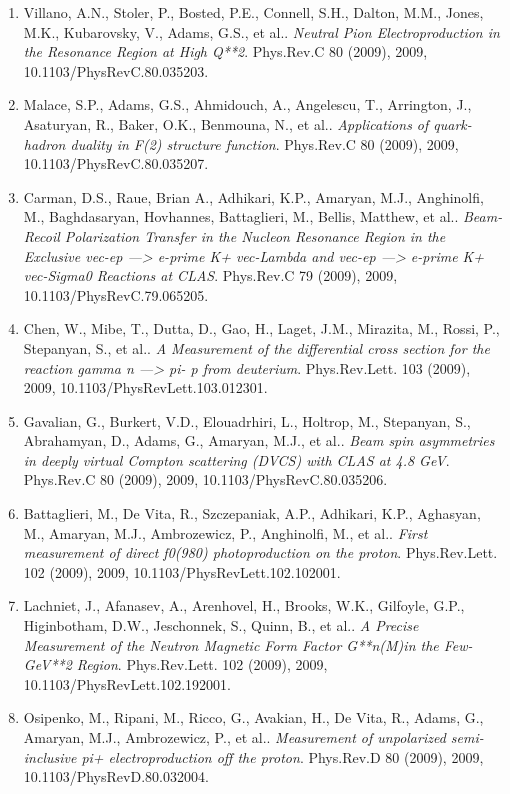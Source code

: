 \begin{enumerate}
\item Villano, A.N., Stoler, P., Bosted, P.E., Connell, S.H., Dalton, M.M., Jones, M.K., Kubarovsky, V., Adams, G.S., et al.. \textit{Neutral Pion Electroproduction in the Resonance Region at High Q**2}. Phys.Rev.C 80 (2009), 2009, 10.1103/PhysRevC.80.035203.
\item Malace, S.P., Adams, G.S., Ahmidouch, A., Angelescu, T., Arrington, J., Asaturyan, R., Baker, O.K., Benmouna, N., et al.. \textit{Applications of quark-hadron duality in F(2) structure function}. Phys.Rev.C 80 (2009), 2009, 10.1103/PhysRevC.80.035207.
\item Carman, D.S., Raue, Brian A., Adhikari, K.P., Amaryan, M.J., Anghinolfi, M., Baghdasaryan, Hovhannes, Battaglieri, M., Bellis, Matthew, et al.. \textit{Beam-Recoil Polarization Transfer in the Nucleon Resonance Region in the Exclusive vec-ep ---> e-prime K+ vec-Lambda and vec-ep ---> e-prime K+ vec-Sigma0 Reactions at CLAS}. Phys.Rev.C 79 (2009), 2009, 10.1103/PhysRevC.79.065205.
\item Chen, W., Mibe, T., Dutta, D., Gao, H., Laget, J.M., Mirazita, M., Rossi, P., Stepanyan, S., et al.. \textit{A Measurement of the differential cross section for the reaction gamma n ---> pi- p from deuterium}. Phys.Rev.Lett. 103 (2009), 2009, 10.1103/PhysRevLett.103.012301.
\item Gavalian, G., Burkert, V.D., Elouadrhiri, L., Holtrop, M., Stepanyan, S., Abrahamyan, D., Adams, G., Amaryan, M.J., et al.. \textit{Beam spin asymmetries in deeply virtual Compton scattering (DVCS) with CLAS at 4.8 GeV}. Phys.Rev.C 80 (2009), 2009, 10.1103/PhysRevC.80.035206.
\item Battaglieri, M., De Vita, R., Szczepaniak, A.P., Adhikari, K.P., Aghasyan, M., Amaryan, M.J., Ambrozewicz, P., Anghinolfi, M., et al.. \textit{First measurement of direct f0(980) photoproduction on the proton}. Phys.Rev.Lett. 102 (2009), 2009, 10.1103/PhysRevLett.102.102001.
\item Lachniet, J., Afanasev, A., Arenhovel, H., Brooks, W.K., Gilfoyle, G.P., Higinbotham, D.W., Jeschonnek, S., Quinn, B., et al.. \textit{A Precise Measurement of the Neutron Magnetic Form Factor G**n(M)in the Few-GeV**2 Region}. Phys.Rev.Lett. 102 (2009), 2009, 10.1103/PhysRevLett.102.192001.
\item Osipenko, M., Ripani, M., Ricco, G., Avakian, H., De Vita, R., Adams, G., Amaryan, M.J., Ambrozewicz, P., et al.. \textit{Measurement of unpolarized semi-inclusive pi+ electroproduction off the proton}. Phys.Rev.D 80 (2009), 2009, 10.1103/PhysRevD.80.032004.

\end{enumerate}
